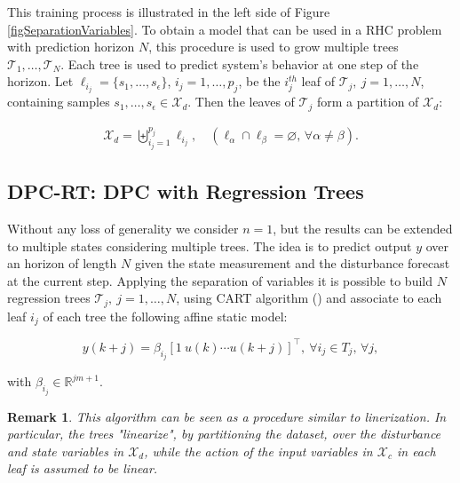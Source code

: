 \documentclass[letterpaper, 10 pt, conference]{ifacconf}  %
\newtheorem{remark}{Remark}
\begin{document}
This training process is illustrated in the left side of Figure \ref{figSeparationVariables}. 
To obtain a model that can be used in a RHC problem with prediction horizon $N$, this procedure is used to grow multiple trees $\mathcal{T}_1,\ldots,\mathcal{T}_N$. Each tree is used to predict system's behavior at one step of the horizon.
Let $\ell_{i_j} = \{s_1,\ldots,s_\epsilon\}$, $i_j=1,\ldots,p_j$, be the $i_j^{th}$ leaf of $\mathcal{T}_j,\ j = 1,\ldots,N$, containing samples $s_1,\ldots,s_\epsilon \in \mathcal{X}_d$. Then the leaves of $\mathcal{T}_j$ form a partition of $\mathcal{X}_d$:

\begin{align}\label{distSetPartition}
	\mathcal{X}_d=\biguplus_{i_j=1}^{p_j}{\ell_{i_j}}, \quad \left(\ell_{\alpha}\cap \ell_{\beta}=\varnothing,\,\forall \alpha\neq \beta \right).
\end{align}

\subsection{DPC-RT: DPC with Regression Trees}
Without any loss of generality we consider $n=1$, but the results can be extended to multiple states considering multiple trees. The idea is to predict output $y$ over an horizon of length $N$ given the state measurement and the disturbance forecast at the current step. Applying the separation of variables it is possible to build $N$ regression trees $\mathcal{T}_j,\ j=1,\ldots,N$, using CART algorithm (\cite{Breiman1984classification}) and associate to each leaf $i_j$ of each tree the following affine static model:

\small
\begin{equation}\label{eqAffineModel}
	y(k+j) = \beta_{i_j}[1\ u(k) \cdots u(k+j)]^\top,\ \forall i_j\in T_j,\,\forall j,
\end{equation}
\normalsize

with $\beta_{i_j}\in\mathbb{R}^{jm+1}$.

\begin{remark}
	This algorithm can be seen as a procedure similar to linerization. In particular, the trees "linearize", by partitioning the dataset, over the disturbance and state variables in $\mathcal{X}_d$, while the action of the input variables in $\mathcal{X}_c$ in each leaf is assumed to be linear.
\end{remark}
\end{document}
